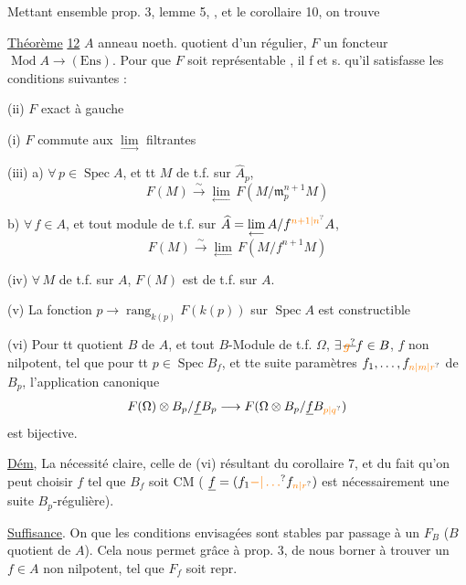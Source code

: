 Mettant ensemble prop. 3, lemme 5,  , et le corollaire 10, on trouve

\uline{Théorème} \uline{12} $A$ anneau noeth. quotient d'un régulier, $F$ un foncteur $\operatorname{Mod} A\longrightarrow(\mathrm{Ens})$. Pour que $F$ soit représentable , il f et s. qu'il satisfasse les conditions suivantes :

(ii) $F$ exact à gauche

(i) $F$ commute aux $\underset{\longrightarrow}{\lim}$ filtrantes

(iii) a) $\forall\,p\in\operatorname{Spec}A$, et tt $M$ de t.f. sur $\widehat A_p$,
\[
 F(M)\overset{\sim}{\longrightarrow}\underset{\longleftarrow}{\lim}\,F(M/\mathfrak m_p^{n+1}M)
\]

b) $\forall\, f\in A$, et tout module de t.f. sur $\widehat A=\underset{\longleftarrow}{\lim}\,A/f^{\unsure{n+1|n}}A$,
\[
 F(M)\overset{\sim}{\longrightarrow}\underset{\longleftarrow}{\lim}\,F(M/f^{n+1}M)
\]

(iv) $\forall\, M$ de t.f. sur $A$, $F(M)$ est de t.f. sur $A$.

(v) La fonction $p\longrightarrow\operatorname{rang}_{k(p)}F(k(p))$ sur $\operatorname{Spec}A$ est constructible

(vi) Pour tt quotient  $B$ de $A$, et tout $B$-Module de t.f. $\Omega$, $\exists\,\deleted{\unsure{g}}f\in B$, $f$ non nilpotent, tel que pour tt $p\in\operatorname{Spec}B_f$, et tte suite   paramètres $f_1,\ldots,f_{\unsure{n|m|r}}$ de $B_p$, l'application canonique
\[
 F(\Omega)\otimes B_p/\underline f B_p\longrightarrow F(\Omega\otimes B_p/\underline f B_{\unsure{p|q}})
\]
est bijective.

\uline{Dém}, La nécessité claire, celle de (vi) résultant du  corollaire 7, et du fait qu'on peut choisir $f$ tel que $B_f$ soit CM ( $\underline f=(f_1\unsure{-|\ldots}f_{\unsure{n|r}})$ est nécessairement une suite  $B_p$-régulière).

\uline{Suffisance}. On  que les conditions envisagées sont stables par passage à un $F_B$ ($B$ quotient de $A$). Cela nous permet   grâce à prop. 3, de nous borner à trouver un $f\in A$ non nilpotent, tel que $F_f$ soit repr.

